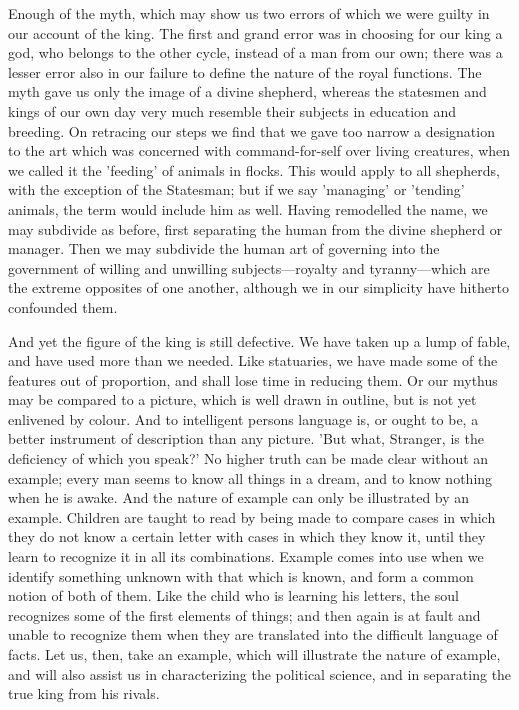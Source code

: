 \documentclass[11pt,letter]{article}
\begin{document}
\par  Enough of the myth, which may show us two errors of which we were guilty in our account of the king. The first and grand error was in choosing for our king a god, who belongs to the other cycle, instead of a man from our own; there was a lesser error also in our failure to define the nature of the royal functions. The myth gave us only the image of a divine shepherd, whereas the statesmen and kings of our own day very much resemble their subjects in education and breeding. On retracing our steps we find that we gave too narrow a designation to the art which was concerned with command-for-self over living creatures, when we called it the 'feeding' of animals in flocks. This would apply to all shepherds, with the exception of the Statesman; but if we say 'managing' or 'tending' animals, the term would include him as well. Having remodelled the name, we may subdivide as before, first separating the human from the divine shepherd or manager. Then we may subdivide the human art of governing into the government of willing and unwilling subjects—royalty and tyranny—which are the extreme opposites of one another, although we in our simplicity have hitherto confounded them.

\par  And yet the figure of the king is still defective. We have taken up a lump of fable, and have used more than we needed. Like statuaries, we have made some of the features out of proportion, and shall lose time in reducing them. Or our mythus may be compared to a picture, which is well drawn in outline, but is not yet enlivened by colour. And to intelligent persons language is, or ought to be, a better instrument of description than any picture. 'But what, Stranger, is the deficiency of which you speak?' No higher truth can be made clear without an example; every man seems to know all things in a dream, and to know nothing when he is awake. And the nature of example can only be illustrated by an example. Children are taught to read by being made to compare cases in which they do not know a certain letter with cases in which they know it, until they learn to recognize it in all its combinations. Example comes into use when we identify something unknown with that which is known, and form a common notion of both of them. Like the child who is learning his letters, the soul recognizes some of the first elements of things; and then again is at fault and unable to recognize them when they are translated into the difficult language of facts. Let us, then, take an example, which will illustrate the nature of example, and will also assist us in characterizing the political science, and in separating the true king from his rivals.
\end{document}
